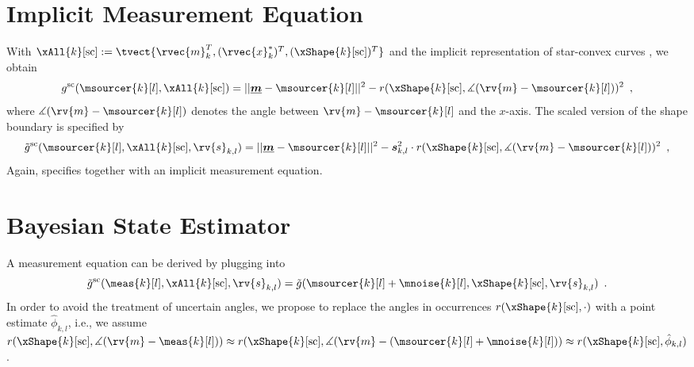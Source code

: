 \documentclass[preprint,1p,11pt]{ISAS_IR}
\begin{document}
\section{Implicit Measurement Equation} 
With $\xAll{k}[\text{sc}]:=\tvect{ \rvec{m}^T_k, (\rvec{x}^*_k)^T, (\xShape{k}[\text{sc}])^T }$ and the implicit representation of star-convex curves \cite{Uensalan2001}, we obtain 
\begin{equation}\label{eqn:sc_impl_ms1}
g^{\text{sc}}(\msourcer{k}[l],\xAll{k}[\text{sc}])=  ||\boldsymbol{\underline{m}} -  \msourcer{k}[l]||^2-  r( \xShape{k}[\text{sc}] , \measuredangle(\rv{m} - \msourcer{k}[l]  )  )^2 \enspace,  
\end{equation}
 where $\measuredangle(\rv{m} - \msourcer{k}[l]  )$      denotes the angle between $\rv{m} - \msourcer{k}[l]$ and the $x$-axis.
The scaled version of the shape boundary is specified by
\begin{equation}\label{eqn:sc_impl_ms2}
\tilde{g}^{\text{sc}}(\msourcer{k}[l],\xAll{k}[\text{sc}],  \rv{s}_{k,l})=  ||\boldsymbol{\underline{m}} -  \msourcer{k}[l]||^2- \boldsymbol{s}_{k,l}^2 \cdot r( \xShape{k}[\text{sc}] , \measuredangle(\rv{m} - \msourcer{k}[l]  )  )^2 \enspace,  
\end{equation}
Again,   specifies together with  an implicit measurement equation.





\section{Bayesian State Estimator}\label{ssec:starconvex_bayesest}
A measurement equation can be derived  by  plugging  into  
\begin{equation}\label{eqn:meas_noise_approx_ellipticSDASdasd}
 \tilde{g}^{\text{sc}}( \meas{k}[l] , \xAll{k}[\text{sc}],\rv{s}_{k,l})  =  \tilde{g}( \msourcer{k}[l]+\mnoise{k}[l], \xShape{k}[\text{sc}],\rv{s}_{k,l})  \enspace .
\end{equation}
In order to avoid the treatment of uncertain angles, we propose to replace the angles in  
occurrences $r( \xShape{k}[\text{sc}] , \cdot )$ with a point estimate $\hat{\phi}_{k,l}$, i.e.,  we assume $r( \xShape{k}[\text{sc}] , \measuredangle(\rv{m} - \meas{k}[l] )) \approx         r( \xShape{k}[\text{sc}] , \measuredangle(\rv{m} - (\msourcer{k}[l]+\mnoise{k}[l])  ) \approx  r( \xShape{k}[\text{sc}] , \hat{\phi}_{k,l})$.
\end{document}
